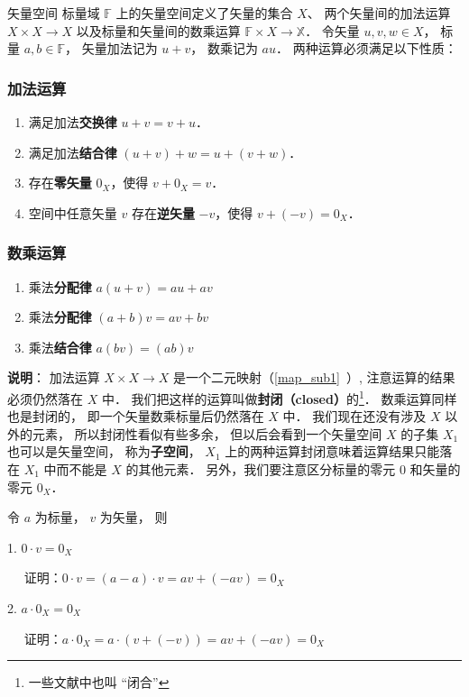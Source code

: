 \begin{definition}{矢量空间}
标量域 $\mathbb F$ 上的矢量空间定义了矢量的集合 $X$、 两个矢量间的加法运算 $X\times X \to X$ 以及标量和矢量间的数乘运算 $\mathbb F \times X \to \mathbb X$． 令矢量 $u,v,w \in X$， 标量 $a,b \in \mathbb F$， 矢量加法记为 $u + v$， 数乘记为 $a u$． 两种运算必须满足以下性质：

\subsubsection{加法运算}
\begin{enumerate}
\item 满足加法\textbf{交换律} $u + v = v + u$．
\item 满足加法\textbf{结合律} $(u + v) + w = u + (v + w)$．
\item 存在\textbf{零矢量} $0_X$，使得 $v + 0_X = v$．
\item 空间中任意矢量 $v$ 存在\textbf{逆矢量} $-v$，使得 $v + (-v) = 0_X$．
\end{enumerate}

\subsubsection{数乘运算}
\begin{enumerate}
\item 乘法\textbf{分配律} $a(u + v) = au + av$ 
\item 乘法\textbf{分配律} $(a + b)v = av + bv$
\item 乘法\textbf{结合律} $a (b v) = (ab) v$
\end{enumerate}
\end{definition}

\textbf{说明}： 加法运算 $X \times X \to X$ 是一个二元映射（\autoref{map_sub1}~）, 注意运算的结果必须仍然落在 $X$ 中． 我们把这样的运算叫做\textbf{封闭（closed）}的\footnote{一些文献中也叫 “闭合”}． 数乘运算同样也是封闭的， 即一个矢量数乘标量后仍然落在 $X$ 中． 我们现在还没有涉及 $X$ 以外的元素， 所以封闭性看似有些多余， 但以后会看到一个矢量空间 $X$ 的子集 $X_1$ 也可以是矢量空间， 称为\textbf{子空间}， $X_1$ 上的两种运算封闭意味着运算结果只能落在 $X_1$ 中而不能是 $X$ 的其他元素． 另外，我们要注意区分标量的零元 $0$ 和矢量的零元 $0_X$．

\begin{corollary}{}
令 $a$ 为标量， $v$ 为矢量， 则

1. $0\cdot v=0_X$

$\quad$ 证明：$0\cdot v=(a-a)\cdot v=av+(-av)=0_X$

2. $a \cdot 0_X=0_X$

$\quad$ 证明：$a \cdot 0_X=a\cdot(v+(-v))=av+(-av)=0_X$

\end{corollary}

